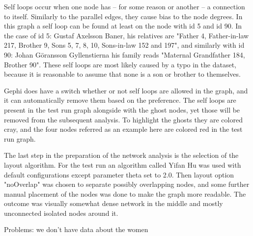 \documentclass[a4paper,12pt]{article}
\begin{document}
Self loops occur when one node has – for some reason or another – a connection to itself. Similarly to the parallel edges, they cause bias to the node degrees. In this graph a self loop can be found at least on the node with id 5 and id 90. In the case of id 5: Gustaf Axelsson Baner, his relatives are "Father 4, Father-in-law 217, Brother 9, Sons 5, 7, 8, 10, Sons-in-law 152 and 197", and similarly with id 90: Johan Göransson Gyllenstierna his family reads "Maternal Grandfather 184, Brother 90". These self loops are most likely caused by a typo in the dataset, because it is reasonable to assume that none is a son or brother to themselves.
 
Gephi does have a switch whether or not self loops are allowed in the graph, and it can automatically remove them based on the preference. The self loops are present in the test run graph alongside with the ghost nodes, yet those will be removed from the subsequent analysis. To highlight the ghosts they are colored cray, and the four nodes referred as an example here are colored red in the test run graph.

The last step in the preparation of the network analysis is the selection of the layout algorithm. For the test run an algorithm called Yifan Hu was used with default configurations except parameter theta set to 2.0. Then layout option "noOverlap" was chosen to separate possibly overlapping nodes, and some further manual placement of the nodes was done to make the graph more readable. The outcome was visually somewhat dense network in the middle and mostly unconnected isolated nodes around it. 

Problems: we don't have data about the women
\end{document}
